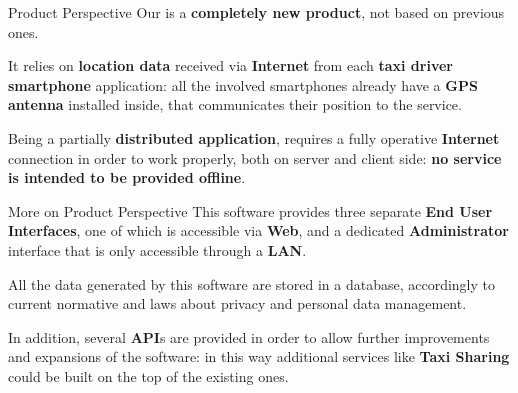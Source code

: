 \documentclass{../common/latex_classes/pdf_presentation}
\begin{document}
	\begin{frame}{Product Perspective}
		Our \myTaxiService{} is a \textbf{completely new product}, not based on previous ones.\par 
		It relies on \textbf{location data} received via \textbf{Internet} from each \textbf{taxi driver smartphone} application: all the involved smartphones already have a \textbf{GPS antenna} installed inside, that communicates their position to the service.\par
		Being a partially \textbf{distributed application}, \myTaxiService{} requires a fully operative \textbf{Internet} connection in order to work properly, both on server and client side: \textbf{no service is intended to be provided offline}.
	\end{frame}
	\begin{frame}{More on Product Perspective}
		This software provides three separate \textbf{End User Interfaces}, one of which is accessible via \textbf{Web}, and a dedicated \textbf{Administrator} interface that is only accessible through a \textbf{LAN}.\par
		All the data generated by this software are stored in a database, accordingly to current normative and laws about privacy and personal data management.\par 
		In addition, several \textbf{API}s are provided in order to allow further improvements and expansions of the software: in this way additional services like \textbf{Taxi Sharing} could be built on the top of the existing ones.
	\end{frame}
\end{document}
